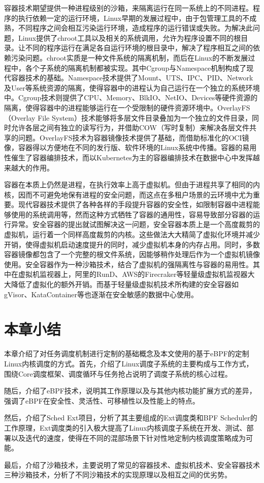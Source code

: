容器技术期望提供一种进程级别的沙箱，来隔离运行在同一系统上的不同进程。程序的执行依赖一定的运行环境，Linux早期的发展过程中，由于包管理工具的不成熟，不同程序之间会相互污染运行环境，造成程序的运行错误或失败。为解决此问题，Linux提供了chroot工具以及相关的系统调用，允许为程序设置不同的根目录。让不同的程序运行在满足各自运行环境的根目录中，解决了程序相互之间的依赖污染问题。chroot实质是一种文件系统的隔离机制，而后在Linux的不断发展过程中，各个子系统的隔离机制都被实现。其中Cgroup与Namespace机制构成了现代容器技术的基础。Namespace技术提供了Mount、UTS、IPC、PID、Network及User等系统资源的隔离，使得容器中的进程认为自己运行在一个独立的系统环境中。Cgroup技术则提供了CPU、Memory、BlkIO、NetIO、Devices等硬件资源的隔离，使得容器中的进程能够运行在一个受限制的硬件资源环境中。OverlayFS（Overlay File System）技术能够将多层文件目录叠加为一个独立的文件目录，同时允许各层之间有独立的读写行为，并借助COW（写时复制）来解决各层文件共享的问题。OverlayFS技术为容器镜像技术提供了基础，而借助标准化的OCI镜像，容器得以方便地在不同的发行版、软件环境的Linux系统中传播。容器的易用性催生了容器编排技术，而以Kubernetes为主的容器编排技术在数据中心中发挥越来越大的作用。

容器在本质上仍然是进程，在执行效率上高于虚拟机。但由于进程共享了相同的内核，因而不可避免地保有进程的安全问题，而这点在多租户场景的云环境中尤为重要。现代容器技术提供了各种各样的手段提升容器的安全性，如限制容器中进程能够使用的系统调用等，然而这种方式牺牲了容器的通用性，容易导致部分容器的运行异常。安全容器的提出就试图解决这一问题，安全容器本质上是一个高度裁剪的虚拟机，运行着一个同样高度裁剪的内核。这些做法大大精简了虚拟化环境并减少开销，使得虚拟机启动速度提升的同时，减少虚拟机本身的内存占用。同时，多数容器镜像都包含了一个完整的根文件系统，因能够稍作处理后作为一个虚拟机镜像使用。安全容器作为一种沙箱技术，结合了虚拟机的强隔离性与容器的易用性。其中在虚拟机监视器上，阿里的RunD\citep{li2022rund}、AWS的Firecraker\citep{agache2020firecracker}等轻量级虚拟机监视器大大降低了虚拟化的额外开销。而基于轻量级虚拟机技术所构建的安全容器如gVisor、KataContainer\citep{randazzo2019kata}等也逐渐在安全敏感的数据中心使用。

\section{本章小结}

本章介绍了对任务调度机制进行定制的基础概念及本文使用的基于eBPF的定制Linux内核调度的方式。首先，介绍了Linux调度子系统的主要构成与工作方式，围绕Core调度框架、调度循环与任务抢占说明了调度子系统的核心过程。

随后，介绍了eBPF技术，说明其工作原理以及与其他内核功能扩展方式的差异，强调了eBPF在安全性、灵活性、可移植性以及性能上的特点。

然后，介绍了Sched Ext项目，分析了其主要组成的Ext调度类和BPF Scheduler的工作原理，Ext调度类的引入极大提高了Linux内核调度子系统在开发、测试、部署以及迭代的速度，使得在不同的混部场景下针对性地定制内核调度策略成为可能。

最后，介绍了沙箱技术，主要说明了常见的容器技术、虚拟机技术、安全容器技术三种沙箱技术，分析了不同沙箱技术的实现原理以及相互之间的优劣势。